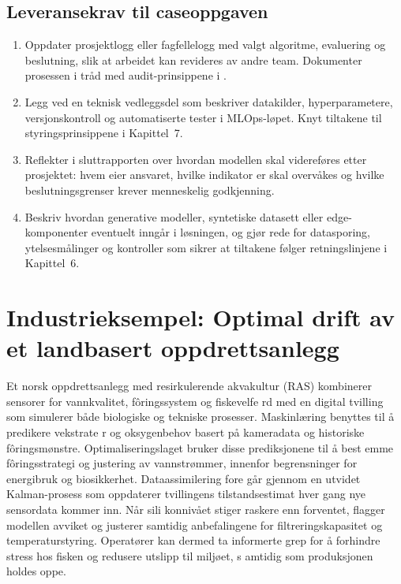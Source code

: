 \subsection{Leveransekrav til caseoppgaven}
\begin{enumerate}
    \item Oppdater prosjektlogg eller fagfellelogg med valgt algoritme, evaluering og beslutning, slik at arbeidet kan revideres
    av andre team. Dokumenter prosessen i tråd med audit-prinsippene i \citet{raji2020closing}.
    \item Legg ved en teknisk vedleggsdel som beskriver datakilder, hyperparametere, versjonskontroll og automatiserte tester i MLOps-løpet. Knyt tiltakene til styringsprinsippene i Kapittel~7.
    \item Reflekter i sluttrapporten over hvordan modellen skal videreføres etter prosjektet: hvem eier ansvaret, hvilke indikator
    er skal overvåkes og hvilke beslutningsgrenser krever menneskelig godkjenning.
    \item Beskriv hvordan generative modeller, syntetiske datasett eller edge-komponenter eventuelt inngår i løsningen, og gjør rede for datasporing, ytelsesmålinger og kontroller som sikrer at tiltakene følger retningslinjene i Kapittel~6.
\end{enumerate}

\section{Industrieksempel: Optimal drift av et landbasert oppdrettsanlegg}
Et norsk oppdrettsanlegg med resirkulerende akvakultur (RAS) kombinerer sensorer for vannkvalitet, fôringssystem og fiskevelfe
rd med en digital tvilling som simulerer både biologiske og tekniske prosesser. Maskinlæring benyttes til å predikere vekstrate
r og oksygenbehov basert på kameradata og historiske fôringsmønstre. Optimaliseringslaget bruker disse prediksjonene til å best
emme fôringsstrategi og justering av vannstrømmer, innenfor begrensninger for energibruk og biosikkerhet. Dataassimilering fore
går gjennom en utvidet Kalman-prosess som oppdaterer tvillingens tilstandsestimat hver gang nye sensordata kommer inn. Når sili
konnivået stiger raskere enn forventet, flagger modellen avviket og justerer samtidig anbefalingene for filtreringskapasitet og
temperaturstyring. Operatører kan dermed ta informerte grep for å forhindre stress hos fisken og redusere utslipp til miljøet, s
amtidig som produksjonen holdes oppe.

